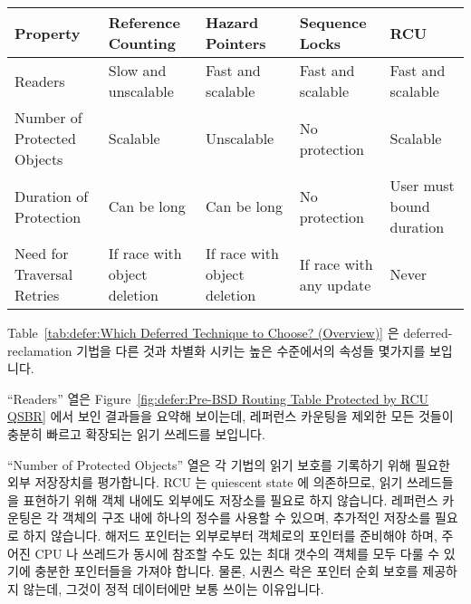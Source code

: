 \begin{table*}
\renewcommand*{\arraystretch}{1.25}
\footnotesize
\centering\OneColumnHSpace{-.3in}
\begin{tabularx}{5.3in}{>{\raggedright\arraybackslash}p{1.1in}
    >{\raggedright\arraybackslash}p{1.0in}
    >{\raggedright\arraybackslash}X
    >{\raggedright\arraybackslash}X
    >{\raggedright\arraybackslash}p{.9in}}
	\toprule
	Property
		& Reference Counting
			& Hazard Pointers
				& Sequence Locks
					& RCU \\
	\midrule
	Readers
		& Slow and unscalable
			& Fast and scalable
				& Fast and scalable
					& Fast and scalable \\
	Number of Protected Objects
		& Scalable
			& Unscalable
				& No protection
					& Scalable \\
	Duration of Protection
		& Can be long
			& Can be long
				& No protection
					& User must bound duration \\
	Need for Traversal Retries
		& If race with object deletion
			& If race with object deletion
				& If race with any update
					& Never \\
	\bottomrule
\end{tabularx}
\caption{Which Deferred Technique to Choose? (Overview)}
\label{tab:defer:Which Deferred Technique to Choose? (Overview)}
\end{table*}

Table~\ref{tab:defer:Which Deferred Technique to Choose? (Overview)}
은 deferred-reclamation 기법을 다른 것과 차별화 시키는 높은 수준에서의 속성들
몇가지를 보입니다.

``Readers'' 열은
Figure~\ref{fig:defer:Pre-BSD Routing Table Protected by RCU QSBR}
에서 보인 결과들을 요약해 보이는데, 레퍼런스 카운팅을 제외한 모든 것들이 충분히
빠르고 확장되는 읽기 쓰레드를 보입니다.

``Number of Protected Objects'' 열은 각 기법의 읽기 보호를 기록하기 위해 필요한
외부 저장장치를 평가합니다.
RCU 는 quiescent state 에 의존하므로, 읽기 쓰레드들을 표현하기 위해 객체 내에도
외부에도 저장소를 필요로 하지 않습니다.
레퍼런스 카운팅은 각 객체의 구조 내에 하나의 정수를 사용할 수 있으며, 추가적인
저장소를 필요로 하지 않습니다.
해저드 포인터는 외부로부터 객체로의 포인터를 준비해야 하며, 주어진 CPU 나
쓰레드가 동시에 참조할 수도 있는 최대 갯수의 객체를 모두 다룰 수 있기에 충분한
포인터들을 가져야 합니다.
물론, 시퀀스 락은 포인터 순회 보호를 제공하지 않는데, 그것이 정적 데이터에만
보통 쓰이는 이유입니다.

